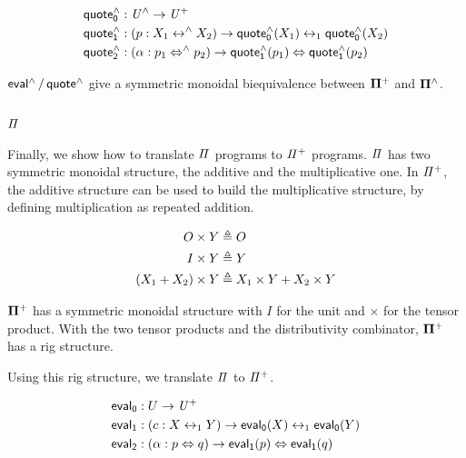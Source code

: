 \begin{definition}
  \begin{align*}
    \quoteh_{0} & : \UHat \to \UPlus                                                            \\
    \quoteh_{1} & : (p : X_{1} \isoh X_{2}) \to \quoteh_{0}(X_{1}) \iso \quoteh_{0}(X_{2})      \\
    \quoteh_{2} & : (\alpha : p_{1} \Isoh p_{2}) \to \quoteh_{1}(p_{1}) \Iso \quoteh_{1}(p_{2}) \\
  \end{align*}
\end{definition}

\begin{proposition}
  $\evalh/\quoteh$ give a symmetric monoidal biequivalence between $\mathbf{\Pi^{+}}$ and $\mathbf{\Pi^{\wedge}}$.
\end{proposition}

\subsection{$\mathit{\Pi}$}

Finally, we show how to translate $\mathit{\Pi}$ programs to $\mathit{{\Pi}^{+}}$ programs. $\mathit{\Pi}$ has two symmetric monoidal
structure, the additive and the multiplicative one. In $\mathit{{\Pi}^{+}}$, the additive structure can be used to build the
multiplicative structure, by defining multiplication as repeated addition.

\begin{definition}
  \begin{align*}
    O \times Y           & \mathrel{\triangleq} O                       \\
    I \times Y           & \mathrel{\triangleq} Y                       \\
    (X_1 + X_2) \times Y & \mathrel{\triangleq} X_1 \times Y + X_2 \times Y
  \end{align*}
\end{definition}

\begin{proposition}
  $\mathbf{\Pi^{+}}$ has a symmetric monoidal structure with $I$ for the unit and $\times$ for the tensor product. With the
  two tensor products and the distributivity combinator, $\mathbf{\Pi^{+}}$ has a rig structure.
\end{proposition}

Using this rig structure, we translate $\mathit{\Pi}$ to $\mathit{{\Pi}^{+}}$.

\begin{definition}
  \begin{align*}
    \evalt_{0} & : U \to \UPlus                                             \\
    \evalt_{1} & : (c : X \iso Y) \to \evalt_{0}(X) \iso \evalt_{0}(Y)      \\
    \evalt_{2} & : (\alpha : p \Iso q) \to \evalt_{1}(p) \Iso \evalt_{1}(q) \\
  \end{align*}
\end{definition}

